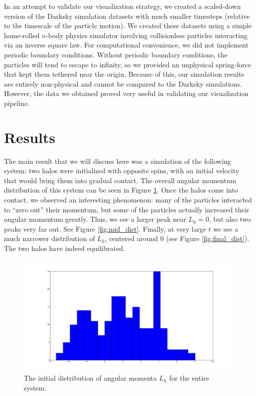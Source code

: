 \documentclass[12pt]{article}
\begin{document}
In an attempt to validate our visualization strategy, we created a scaled-down
version of the Darksky simulation datasets with much smaller timesteps
(relative to the timescale of the particle motion). We created these datasets
using a simple home-rolled $n$-body physics simulator involving collisionless
particles interacting via an inverse square law. For computational convenience,
we did not implement periodic boundary conditions. Without periodic boundary
conditions, the particles will tend to escape to infinity, so we provided an
unphysical spring-force that kept them tethered near the origin. Because of
this, our simulation results are entirely non-physical and cannot be compared
to the Darksky simulations. However, the data we obtained proved very useful in
validating our visualization pipeline.

\section{Results}
The main result that we will discuss here was a simulation of the following
system: two halos were initialized with opposite spins, with an initial
velocity that would bring them into gradual contact. The overall angular
momentum distribution of this system can be seen in Figure \ref{fig:init_dist}.
Once the halos come into contact, we observed an interesting phenomenon: many
of the particles interacted to ``zero out'' their momentum, but some of the
particles actually increased their angular momentum greatly. Thus, we see
a larger peak near $L_h = 0$, but also two peaks very far out. See Figure
\ref{fig:mid_dist}.  Finally, at very large $t$ we see a much narrower
distribution of $L_h$, centered around $0$ (see Figure \ref{fig:final_dist}).
The two halos have indeed equilibrated.

\begin{figure}[htp]
\centering
\includegraphics[width=0.5\columnwidth]{../figures/zerosum_mixing_initial_distribution.png}
\caption{The initial distribution of angular momenta $L_h$ for the entire system.}
\label{fig:init_dist}
\end{figure}
\end{document}
